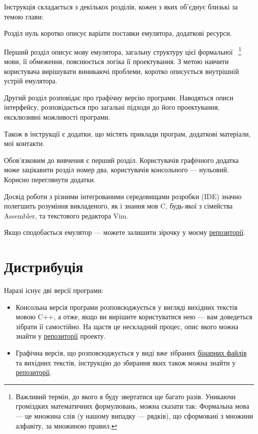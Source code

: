 \documentclass[oneside,final,14pt]{extreport}
\begin{document}
\bigskip

Інструкція складається з декількох розділів, кожен з яких об'єднує близькі за темою глави:

Розділ нуль коротко описує варіати поставки емулятора, додаткові ресурси.

Перший розділ описує мову емулятора, загальну структуру цієї 
формальної~
\footnote{Важливий термін, до якого я буду звертатися ще багато разів. Уникаючи громіздких математичних формулювань, можна сказати так: Формальна мова --- це множина слів (у нашому випадку --- рядків), що сформовані з множини алфавіту, за множиною правил.}
мови, її обмеження, пояснюється логіка її проектування. З метою навчити користувача вирішувати виникаючі проблеми, коротко описується внутрішній устрій емулятора.

Другий розділ розповідає про графічну версію програми. Наводяться описи інтерфейсу, розповідається про загальні підходи до його проектування, ексклюзивні можливості програми. 


Також в інструкції є додатки, що містять приклади програм, додаткові матеріали, мої контакти.

\bigskip

\bigskip 

Обов'язковим до вивчення є перший розділ. Користувачів графічного додатка може зацікавити розділ номер два, користувачів консольного --- нульовий. Корисно переглянути додатки.

Досвід роботи з різними інтегрованими середовищами розробки (IDE) значно полегшить розуміння викладеного, як і знання мов C, будь-якої з сімейства Assembler, та текстового редактора Vim.

\bigskip

\bigskip

Якщо сподобається емулятор --- можете залишити зірочку у моєму  \href{https://github.com/Kaifolog/TME}{репозиторії}.

\setcounter{chapter}{-1}

\chapter{Дистрибуція}

 
\vspace{0.4 cm}
 
Наразі існує дві версії програми: 
\begin{itemize}
	\item Консольна версія програми розповсюджується у вигляді вихідних текстів мовою C++, а отже, якщо ви вирішите користуватися нею --- вам доведеться зібрати її самостійно. На щастя це нескладний процес, опис якого можна знайти у \href{https://github.com/Kaifolog/TME}{репозиторії} проекту.
	\item Графічна версія, що розповсюджується у виді вже зібраних \href{https://kaifolog.github.io/TME-website/}{бінарних файлів} та вихідних текстів, інструкцію до збирання яких також можна знайти у \href{https://github.com/Kaifolog/TME}{репозиторії}. 
\end{itemize}
\end{document}
